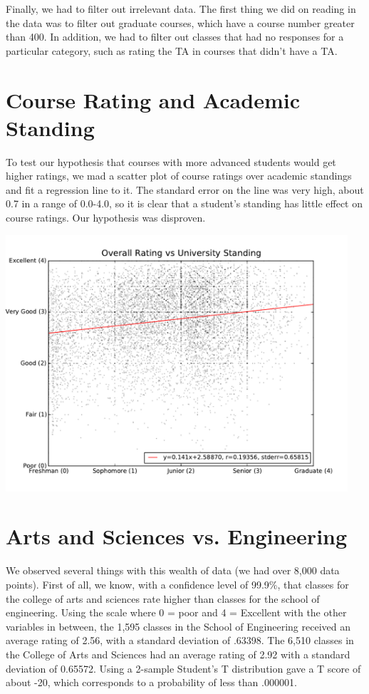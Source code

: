 \documentclass[12pt]{article}
\begin{document}
Finally, we had to filter out irrelevant data. The first thing we did on reading in the data was to filter out graduate courses, which have a course number greater than 400. In addition, we had to filter out classes that had no responses for a particular category, such as rating the TA in courses that didn't have a TA. 

\section{Course Rating and Academic Standing}
To test our hypothesis that courses with more advanced students would get higher ratings, we mad a scatter plot of course ratings over academic standings and fit a regression line to it. The standard error on the line was very high, about 0.7 in a range of 0.0-4.0, so it is clear that a student's standing has little effect on course ratings. Our hypothesis was disproven.

\begin{center}
    \includegraphics[width=5in]{figures/rating_vs_standing.pdf}
\end{center}

\section{Arts and Sciences vs. Engineering}
We observed several things with this wealth of data (we had over 8,000 data points). First of all, we know, with a confidence level of 99.9\%, that classes for the college of arts and sciences rate higher than classes for the school of engineering. Using the scale where 0 = poor and 4 = Excellent with the other variables in between, the 1,595 classes in the School of Engineering received an average rating of 2.56, with a standard deviation of .63398. The 6,510 classes in the College of Arts and Sciences had an average rating of 2.92 with a standard deviation of 0.65572. Using a 2-sample Student's T distribution gave a T score of about -20, which corresponds to a probability of less than .000001.
\end{document}
